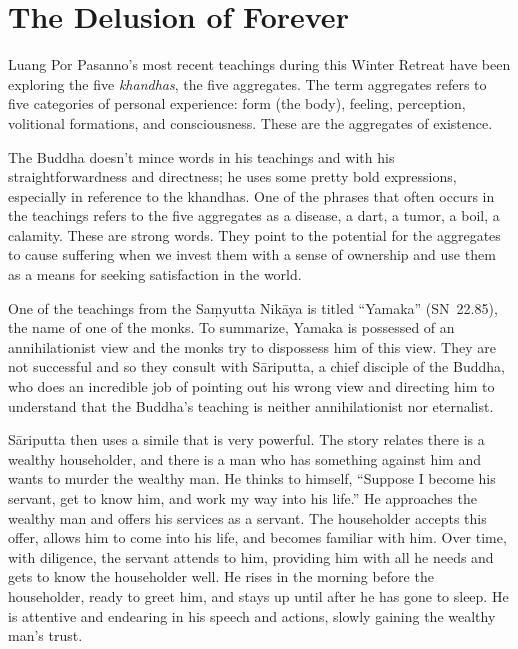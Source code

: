 
\chapter{The Delusion of Forever}


Luang Por Pasanno's most recent teachings during this Winter Retreat have been exploring the five \emph{khandhas}, the five aggregates. The term aggregates refers to five categories of personal experience: form (the body), feeling, perception, volitional formations, and consciousness. These are the aggregates of existence.

The Buddha doesn't mince words in his teachings and with his straightforwardness and directness; he uses some pretty bold expressions, especially in reference to the khandhas. One of the phrases that often occurs in the teachings refers to the five aggregates as a disease, a dart, a tumor, a boil, a calamity. These are strong words. They point to the potential for the aggregates to cause suffering when we invest them with a sense of ownership and use them as a means for seeking satisfaction in the world.

One of the teachings from the Saṃyutta Nikāya is titled ``Yamaka'' \mbox{(SN 22.85)}, the name of one of the monks. To summarize, Yamaka is possessed of an annihilationist view and the monks try to dispossess him of this view. They are not successful and so they consult with Sāriputta, a chief disciple of the Buddha, who does an incredible job of pointing out his wrong view and directing him to understand that the Buddha's teaching is neither annihilationist nor eternalist.

Sāriputta then uses a simile that is very powerful. The story relates there is a wealthy householder, and there is a man who has something against him and wants to murder the wealthy man. He thinks to himself, ``Suppose I become his servant, get to know him, and work my way into his life.'' He approaches the wealthy man and offers his services as a servant. The householder accepts this offer, allows him to come into his life, and becomes familiar with him. Over time, with diligence, the servant attends to him, providing him with all he needs and gets to know the householder well. He rises in the morning before the householder, ready to greet him, and stays up until after he has gone to sleep. He is attentive and endearing in his speech and actions, slowly gaining the wealthy man's trust.

